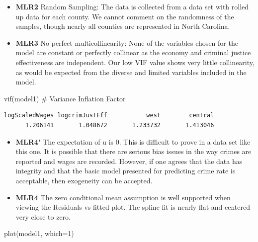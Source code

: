 \documentclass[]{article}
\newenvironment{Shaded}{}{}
\newcommand{\CommentTok}[1]{\textcolor[rgb]{0.00,0.50,0.00}{#1}}
\newcommand{\DataTypeTok}[1]{#1}
\newcommand{\DecValTok}[1]{#1}
\newcommand{\KeywordTok}[1]{\textcolor[rgb]{0.00,0.00,1.00}{#1}}
\newcommand{\NormalTok}[1]{#1}
\begin{document}
\begin{itemize}
\item
  \textbf{MLR2} Random Sampling: The data is collected from a data set
  with rolled up data for each county. We cannot comment on the
  randomness of the samples, though nearly all counties are represented
  in North Carolina.
\item
  \textbf{MLR3} No perfect multicollinearity: None of the variables
  chosen for the model are constant or perfectly collinear as the
  economy and criminal justice effectiveness are independent. Our low
  VIF value shows very little collinearity, as would be expected from
  the diverse and limited variables included in the model.
\end{itemize}

\begin{Shaded}
\begin{Highlighting}[]
\KeywordTok{vif}\NormalTok{(model1) }\CommentTok{# Variance Inflation Factor}
\end{Highlighting}
\end{Shaded}

\begin{verbatim}
logScaledWages logcrimJustEff           west        central 
      1.206141       1.048672       1.233732       1.413046 
\end{verbatim}

\begin{itemize}
\item
  \textbf{MLR4'} The expectation of u is 0. This is difficult to prove
  in a data set like this one. It is possible that there are serious
  bias issues in the way crimes are reported and wages are recorded.
  However, if one agrees that the data has integrity and that the basic
  model presented for predicting crime rate is acceptable, then
  exogeneity can be accepted.
\item
  \textbf{MLR4} The zero conditional mean assumption is well supported
  when viewing the Residuals vs fitted plot. The spline fit is nearly
  flat and centered very close to zero.
\end{itemize}

\begin{Shaded}
\begin{Highlighting}[]
\KeywordTok{plot}\NormalTok{(model1, }\DataTypeTok{which=}\DecValTok{1}\NormalTok{)}
\end{Highlighting}
\end{Shaded}
\end{document}
